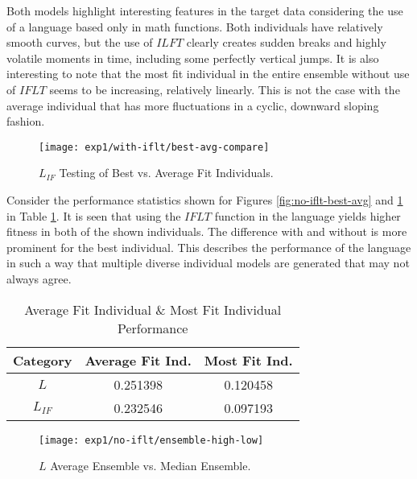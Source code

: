 \documentclass[12pt, letterpaper]{article}
\begin{document}
\textrm{ \indent Both models highlight interesting features in the target data considering the use of a language based only in math functions. Both individuals have relatively smooth curves, but the use of $ILFT$ clearly creates sudden breaks and highly volatile moments in time, including some perfectly vertical jumps. It is also interesting to note that the most fit individual in the entire ensemble without use of $IFLT$ seems to be increasing, relatively linearly. This is not the case with the average individual that has more fluctuations in a cyclic, downward sloping fashion. }

\begin{figure}[!htb]
\begin{center}
\texttt{[image: exp1/with-iflt/best-avg-compare]}
\end{center}
\caption{ $L_{IF}$ Testing of Best vs. Average Fit Individuals.}
\label{fig:with-iflt-best-avg}
\end{figure}

\textrm{ \indent Consider the performance statistics shown for Figures \ref{fig:no-iflt-best-avg} and \ref{fig:with-iflt-best-avg} in Table \ref{no-iflt-ind-stats}. It is seen that using the $IFLT$ function in the language yields higher fitness in both of the shown individuals. The difference with and without is more prominent for the best individual. This describes the performance of the language in such a way that multiple diverse individual models are generated that may not always agree.}

\begin{table}[!ht]
\centering
\begin{tabular}{||c|c|c||}
\hline
\textbf{Category} & \textbf{Average Fit Ind.} & \textbf{Most Fit Ind.} \\
\hline
 $L$ & 0.251398 & 0.120458 \\
\hline
$L_{IF}$ & 0.232546 & 0.097193 \\
\hline
\end{tabular}
\caption{Average Fit Individual \& Most Fit Individual Performance}
\label{no-iflt-ind-stats}
\end{table}

\begin{figure}[!htb]
\begin{center}
\texttt{[image: exp1/no-iflt/ensemble-high-low]}
\end{center}
\caption{ $L$ Average Ensemble vs. Median Ensemble.}
\label{fig:no-iflt-avg-med}
\end{figure}
\end{document}

